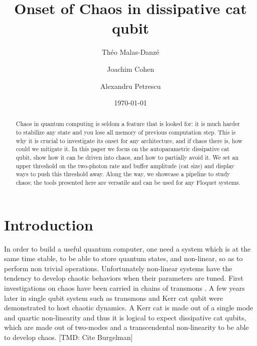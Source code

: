 \documentclass[aps,prx,reprint,floatfix,amsmath,amssymb,longbibliography]{revtex4-2}
\newcommand{\TMD}[1]{{\color{Blue} [TMD: {#1}]}}
\begin{document}
\title{Onset of Chaos in dissipative cat qubit}

\author{Théo Malas-Danzé}

\author{Joachim Cohen}

\author{Alexandru Petrescu}

\date{\today}

\begin{abstract}
Chaos in quantum computing is seldom a feature that is looked for: it is much harder to stabilize any state and you lose all memory of previous computation step. This is why it is crucial to investigate its onset for any architecture, and if chaos there is, how could we mitigate it. In this paper we focus on the autoparametric dissipative cat qubit, show how it can be driven into chaos, and how to partially avoid it. We set an upper threshold on the two-photon rate and buffer amplitude (cat size) and display ways to push this threshold away. Along the way, we showcase a pipeline to study chaos; the tools presented here are versatile and can be used for any Floquet systems.
\end{abstract}

\maketitle

\section{Introduction}
In order to build a useful quantum computer, one need a system which is at the same time stable, to be able to store quantum states, and non-linear, so as to perform non trivial operations. Unfortunately non-linear systems have the tendency to develop chaotic behaviors when their parameters are tuned. First investigations on chaos have been carried in chains of transmons \cite{Berke2022May}. A few years later in single qubit system such as transmons \cite{Cohen2023Apr} and Kerr cat qubit \cite{ChavezCarlos2024Nov} were demonstrated to host chaotic dynamics. A Kerr cat is made out of a single mode and quartic non-linearity and thus it is logical to expect dissipative cat qubits, which are made out of two-modes and a transcendental non-linearity to be able to develop chaos. \TMD{Cite Burgelman}
\end{document}
